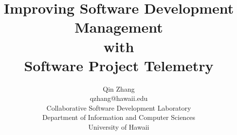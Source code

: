 \documentclass[11pt,oneside,final,times,dissertation,proposal]{uhthesis2e}
\begin{document}
 
  \title{Improving Software Development Management\\with\\Software Project Telemetry}
  \author{Qin Zhang\\qzhang@hawaii.edu\\Collaborative Software Development Laboratory\\Department of Information and Computer Sciences\\University of Hawaii}
  \maketitle

 
  \begin{frontmatter}
%   
%   

    \setlength{\parindent}{6mm} %
    \setlength{\parskip}{3mm}   %
             

    \tableofcontents
  \end{frontmatter}
  
  
  \setlength{\parindent}{6mm} %
  \setlength{\parskip}{3mm}   %
  
  
  
  
  
  
  
  
  
  
  
  
  
  
  \appendix
  
  
  
  

  
  
\end{document}
